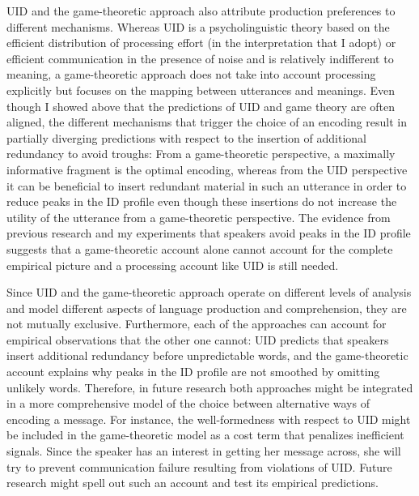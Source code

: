 UID and the game-theoretic approach also attribute production preferences to different mechanisms. Whereas UID is a psycholinguistic theory based on the efficient distribution of processing effort (in the interpretation that I adopt) or efficient communication in the presence of noise and is relatively indifferent to meaning, a game-theoretic approach does not take into account processing explicitly but focuses on the mapping between utterances and meanings. Even though I showed above that the predictions of UID and game theory are often aligned, the different mechanisms that trigger the choice of an encoding result in partially diverging predictions with respect to the insertion of additional redundancy to avoid troughs: From a game-theoretic perspective, a maximally informative fragment is the optimal encoding, whereas from the UID perspective it can be beneficial to insert redundant material in such an utterance in order to reduce peaks in the ID profile even though these insertions do not increase the utility of the utterance from a game-theoretic perspective. The evidence from previous research and my experiments that speakers avoid peaks in the ID profile suggests that a game-theoretic account alone cannot account for the complete empirical picture and a processing account like UID is still needed.

Since UID and the game-theoretic approach operate on different levels of analysis and model different aspects of language production and comprehension, they are not mutually exclusive. Furthermore, each of the approaches can account for empirical observations that the other one cannot: UID predicts that speakers insert additional redundancy before unpredictable words, and the game-theoretic account explains why peaks in the ID profile are not smoothed by omitting unlikely words. Therefore, in future research both approaches might be integrated in a more comprehensive model of the choice between alternative ways of encoding a message. For instance, the well-formedness with respect to UID might be included in the game-theoretic model as a cost term that penalizes inefficient signals. Since the speaker has an interest in getting her message across, she will try to prevent communication failure resulting from violations of UID. Future research might spell out such an account and test its empirical predictions.
